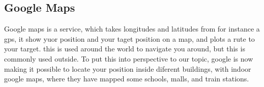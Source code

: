 

\subsection{Google Maps}
Google maps is a service, which takes longitudes and latitudes from for instance a gps, it show yuor position and your taget position on a map, and plots a rute to your target. this is used around the world to navigate you around, but this is commonly used outside. To put this into perspective to our topic, google is now making it possible to locate your position inside diferent buildings, with indoor google maps, where they have mapped some schools, malls, and train stations. 






